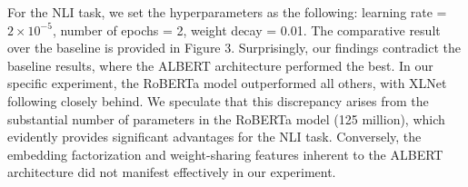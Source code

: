 \documentclass{article}
\begin{document}
For the NLI task, we set the hyperparameters as the following: learning rate = $2 \times 10^{-5}$, number of epochs = 2, weight decay = 0.01. The comparative result over the baseline is provided in Figure 3. Surprisingly, our findings contradict the baseline results, where the ALBERT architecture performed the best. In our specific experiment, the RoBERTa model outperformed all others, with XLNet following closely behind. We speculate that this discrepancy arises from the substantial number of parameters in the RoBERTa model (125 million), which evidently provides significant advantages for the NLI task. Conversely, the embedding factorization and weight-sharing features inherent to the ALBERT architecture did not manifest effectively in our experiment. 




\end{document}
